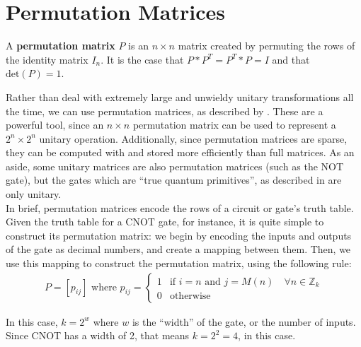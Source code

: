 \section{Permutation Matrices}
\begin{mydef}
 A {\bf permutation matrix} $P$ is an $n \times n$ matrix created by permuting the rows of the identity matrix $I_{n}$. It is the case that $P*P^{T}=P^{T}*P=I$ and that $\text{det}(P)=1$. 
\end{mydef}

Rather than deal with extremely large and unwieldy unitary transformations all the time, we can use permutation matrices, as described by \cite{Williams1999}. These are a powerful tool, since an $n \times n$ permutation matrix can be used to represent a $2^{n} \times 2^{n}$ unitary operation. Additionally, since permutation matrices are sparse, they can be computed with and stored more efficiently than full matrices. As an aside, some unitary matrices are also permutation matrices (such as the NOT gate), but the gates which are ``true quantum primitives'', as described in \cite{Lukac2003} are only unitary. \\

In brief, permutation matrices encode the rows of a circuit or gate's truth table. Given the truth table for a CNOT gate, for instance, it is quite simple to construct its permutation matrix: we begin by encoding the inputs and outputs of the gate as decimal numbers, and create a mapping between them. Then, we use this mapping to construct the permutation matrix, using the following rule:
\begin{align*}
P = [p_{ij}] \text{ where } p_{ij} = 
  \begin{cases}
   1 & \text{if } i=n \text{ and } j=M(n) \hspace{1em} \forall n \in \mathbb{Z}_{k} \\
   0 & \text{otherwise}
  \end{cases}
\end{align*}

In this case, $k=2^{w}$ where $w$ is the ``width'' of the gate, or the number of inputs. Since CNOT has a width of 2, that means $k=2^{2}=4$, in this case. \\

